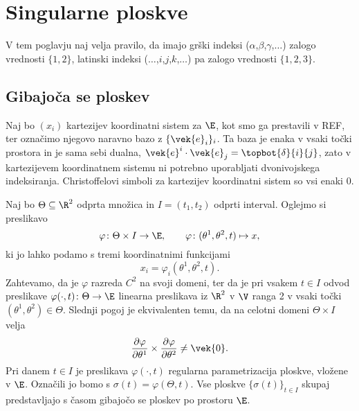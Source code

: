 \chapter{Singularne ploskve}


V tem poglavju naj velja pravilo, da imajo grški indeksi ($\alpha$,$\beta$,$\gamma$,$\dots$) zalogo
vrednosti $\{1,2\}$, latinski indeksi ($\dots$,$i$,$j$,$k$,$\dots$) pa zalogo vrednosti $\{1,2,3\}$.


\section{Gibajoča se ploskev}


Naj bo $(x_i)$ kartezijev koordinatni sistem za $\E$, kot smo ga prestavili v REF, ter označimo
njegovo naravno bazo z $\{\vek{e}_i\}_i$. Ta baza je enaka v vsaki točki prostora in je sama
sebi dualna, $\vek{e}^i\cdot\vek{e}_j=\topbot{\delta}{i}{j}$, zato v kartezijevem
koordinatnem sistemu ni potrebno uporabljati dvonivojskega indeksiranja.
Christoffelovi simboli za kartezijev koordinatni sistem so vsi enaki 0.

Naj bo $\Theta\subseteq\R^2$ odprta množica in $I=(t_1,t_2)$ odprti interval.
Oglejmo si preslikavo
\begin{equation} \label{e:pargip}
	\varphi\colon\Theta\times I\to\E,\qquad \varphi\colon(\theta^1,\theta^2,t)\mapsto x,
\end{equation}
ki jo lahko podamo s tremi koordinatnimi funkcijami
\[
	x_i=\varphi_i(\theta^1,\theta^2,t).
\]
Zahtevamo, da je $\varphi$ razreda $C^2$ na svoji domeni, ter da je pri vsakem $t\in I$ 
odvod preslikave $\varphi(\cdot,t)\colon \Theta\to\E$ linearna preslikava iz $\R^2$ v $\V$ ranga 2 v vsaki
točki $(\theta^1,\theta^2)\in\Theta$. Slednji pogoj je ekvivalenten temu, da na celotni domeni
$\Theta\times I$ velja
\[ \frac{\partial\varphi}{\partial\theta^1}\times\frac{\partial\varphi}{\partial\theta^2}\neq \vek{0}. \]
Pri danem $t\in I$ je preslikava $\varphi(\cdot,t)$ regularna parametrizacija ploskve,
vložene v $\E$. Označili jo bomo s $\sigma(t)=\varphi(\Theta,t)$. Vse ploskve $\{\sigma(t)\}_{t\in I}$
skupaj predstavljajo s časom gibajočo se ploskev po prostoru $\E$.

